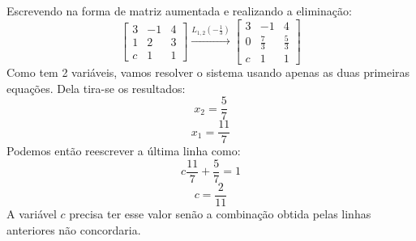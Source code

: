 \documentclass{homework}
\begin{document}
\exercise*
Escrevendo na forma de matriz aumentada e realizando a eliminação:
\[
\left[ \begin{array}{cc|c}
    3 & -1 & 4\\
    1 & 2 & 3\\
    c & 1 & 1
\end{array} \right] \xrightarrow{L_{1,2}(-\frac{1}{3})}
\left[ \begin{array}{cc|c}
    3 & -1 & 4\\
    0 & \frac{7}{3} & \frac{5}{3}\\
    c & 1 & 1
\end{array} \right]
\]
Como tem 2 variáveis, vamos resolver o sistema usando apenas as duas primeiras equações. Dela tira-se os resultados:
\[x_2 = \frac{5}{7}\]
\[x_1 = \frac{11}{7}\]
Podemos então reescrever a última linha como:
\[c\frac{11}{7} + \frac{5}{7} = 1\]
\[c = \frac{2}{11}\]
A variável $c$ precisa ter esse valor senão a combinação obtida pelas linhas anteriores não concordaria.
\end{document}

